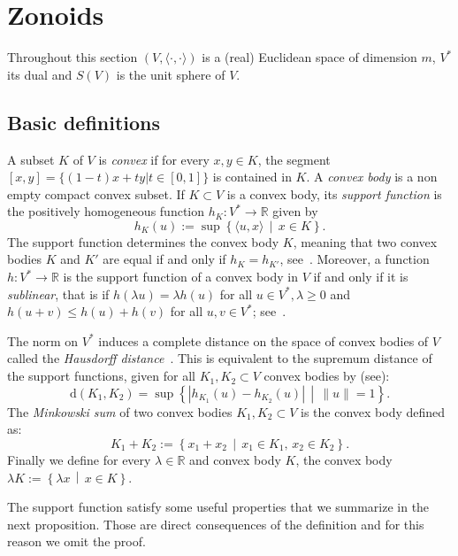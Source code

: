 \documentclass[10pt]{amsart}
\theoremstyle{definition}\newtheorem{defi}[theo]{Definition}\newtheorem{rema}[theo]{Remark}\newtheorem{exam}[theo]{Example}\newtheorem{exem}[theo]{Example}\newtheorem{nota}[theo]{Notation}
\newcommand{\R}{\mathbb{R}}
\newcommand{\dd}{\mathrm{d}}
\newcommand{\set}[2]{\left\{ #1 \, \middle| \, #2\right\}}
\begin{document}
\section{Zonoids}\label{sec:zonoids}

Throughout this section $(V, \langle \cdot, \cdot \rangle)$ is a (real) Euclidean space of dimension $m$, $V^*$ its dual and $S(V)$ is the unit sphere of $V$.

\subsection{Basic definitions}

A subset $K$ of $V$ is \emph{convex} if for every $x,y\in K$, the segment $[x,y]=\{(1-t)x+ty | t\in[0,1]\}$ is contained in $K$. A \emph{convex body} is a non empty compact convex subset. If $K\subset V$ is a convex body, its \emph{support function} is the positively homogeneous function $h_K: V^*\to \R$ given by
\begin{equation*}
h_K(u):=\sup\set{\langle u, x\rangle}{x\in K}.
\end{equation*}
The support function determines the convex body $K$, meaning that two convex bodies $K$ and $K'$ are equal if and only if $h_{K}=h_{K'}$, see~\cite[Section~1.7.1]{bible}. Moreover, a function $h:V^*\to \R$ is the support function of a convex body in $V$ if and only if it is \emph{sublinear}, that is if $h(\lambda u)=\lambda h(u)$ for all $u\in V^*, \lambda \geq 0$ and $h(u+v)\leq h(u)+h(v)$ for all $u,v\in V^*$; see~\cite[Theorem~1.7.1]{bible}.

The norm on $V^*$ induces a complete distance on the space of convex bodies of $V$ called the \emph{Hausdorff distance}~\cite{hausdorff1914grundzuge}. This is equivalent to the supremum distance of the support functions, given for all $K_1,K_2\subset V$ convex bodies by (see\cite[Lemma~1.8.14]{bible}):
\begin{equation}\label{eq:Hausdist}
\dd(K_1,K_2)=\sup\set{|h_{K_1}(u)-h_{K_2}(u)|}{\|u\|=1}.
\end{equation}
The \emph{Minkowski sum} of two convex bodies $K_1,K_2\subset V$ is the convex body defined as:
\begin{equation*}
K_1+K_2:=\set{x_1+x_2}{x_1\in K_1, \, x_2\in K_2}.
\end{equation*}
Finally we define for every $\lambda\in \R$ and convex body $K$, the convex body $\lambda K:=\set{\lambda x}{x\in K}$.

The support function satisfy some useful properties that we summarize in the next proposition. Those are direct consequences of the definition and for this reason we omit the proof.
\end{document}
